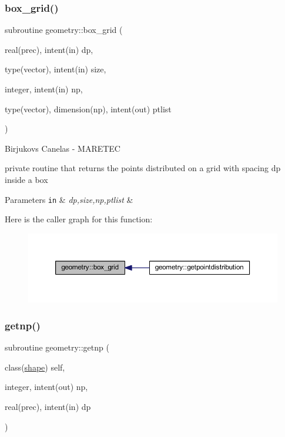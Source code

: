 \subsubsection{\texorpdfstring{box\+\_\+grid()}{box\_grid()}}
{\footnotesize\ttfamily subroutine geometry\+::box\+\_\+grid (\begin{DoxyParamCaption}\item[{real(prec), intent(in)}]{dp,  }\item[{type(vector), intent(in)}]{size,  }\item[{integer, intent(in)}]{np,  }\item[{type(vector), dimension(np), intent(out)}]{ptlist }\end{DoxyParamCaption})\hspace{0.3cm}{\ttfamily [private]}}



Birjukovs Canelas -\/ M\+A\+R\+E\+T\+EC 

private routine that returns the points distributed on a grid with spacing dp inside a box 
\begin{DoxyParams}[1]{Parameters}
\mbox{\tt in}  & {\em dp,size,np,ptlist} & \\
\hline
\end{DoxyParams}
Here is the caller graph for this function\+:\nopagebreak
\begin{figure}[H]
\begin{center}
\leavevmode
\includegraphics[width=350pt]{namespacegeometry_ab7f40c137db819829d3110dac77a2977_icgraph}
\end{center}
\end{figure}
\mbox{\label{namespacegeometry_ad14d7800ac13b9a6722ac96b06ce94c9}} 
\subsubsection{\texorpdfstring{getnp()}{getnp()}}
{\footnotesize\ttfamily subroutine geometry\+::getnp (\begin{DoxyParamCaption}\item[{class(\hyperlink{structgeometry_1_1shape}{shape})}]{self,  }\item[{integer, intent(out)}]{np,  }\item[{real(prec), intent(in)}]{dp }\end{DoxyParamCaption})\hspace{0.3cm}{\ttfamily [private]}}



